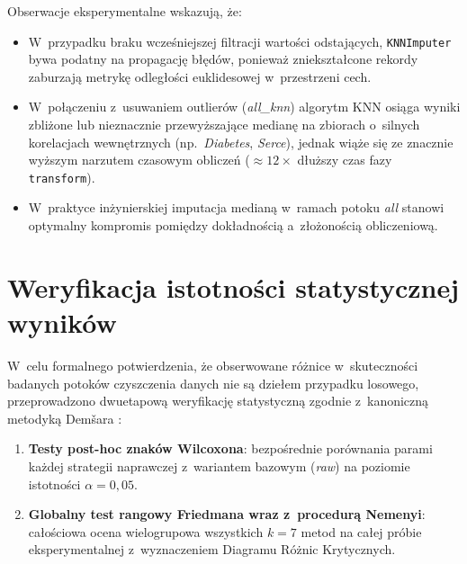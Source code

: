 Obserwacje eksperymentalne wskazują, że:
\begin{itemize}
    \item W~przypadku braku wcześniejszej filtracji wartości odstających, \texttt{KNNImputer} bywa podatny na propagację błędów, ponieważ zniekształcone rekordy zaburzają metrykę odległości euklidesowej w~przestrzeni cech.
    \item W~połączeniu z~usuwaniem outlierów (\textit{all\_knn}) algorytm KNN osiąga wyniki zbliżone lub nieznacznie przewyższające medianę na zbiorach o~silnych korelacjach wewnętrznych (np.~\textit{Diabetes}, \textit{Serce}), jednak wiąże się ze znacznie wyższym narzutem czasowym obliczeń ($\approx 12\times$ dłuższy czas fazy \texttt{transform}).
    \item W~praktyce inżynierskiej imputacja medianą w~ramach potoku \textit{all} stanowi optymalny kompromis pomiędzy dokładnością a~złożonością obliczeniową.
\end{itemize}

\section{Weryfikacja istotności statystycznej wyników}
W~celu formalnego potwierdzenia, że obserwowane różnice w~skuteczności badanych potoków czyszczenia danych nie są dziełem przypadku losowego, przeprowadzono dwuetapową weryfikację statystyczną zgodnie z~kanoniczną metodyką Demšara \cite{Demsar2006}:
\begin{enumerate}
    \item \textbf{Testy post-hoc znaków Wilcoxona}: bezpośrednie porównania parami każdej strategii naprawczej z~wariantem bazowym (\textit{raw}) na poziomie istotności $\alpha = 0{,}05$.
    \item \textbf{Globalny test rangowy Friedmana wraz z~procedurą Nemenyi}: całościowa ocena wielogrupowa wszystkich $k=7$ metod na całej próbie eksperymentalnej z~wyznaczeniem Diagramu Różnic Krytycznych.
\end{enumerate}

